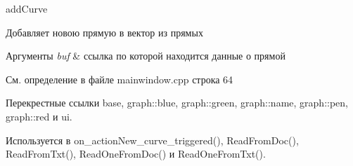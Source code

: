 add\+Curve 

Добавляет новою прямую в вектор из прямых 
\begin{DoxyParams}{Аргументы}
{\em buf} & ссылка по которой находится данные о прямой \\
\hline
\end{DoxyParams}


См. определение в файле mainwindow.\+cpp строка 64



Перекрестные ссылки base, graph\+::blue, graph\+::green, graph\+::name, graph\+::pen, graph\+::red и ui.



Используется в on\+\_\+action\+New\+\_\+curve\+\_\+triggered(), Read\+From\+Doc(), Read\+From\+Txt(), Read\+One\+From\+Doc() и Read\+One\+From\+Txt().


